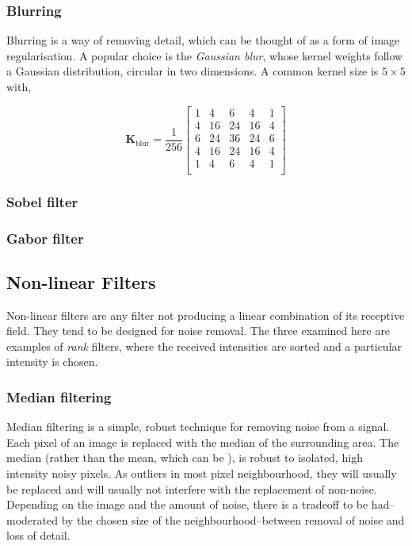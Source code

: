 \documentclass[11pt]{amsart}
\begin{document}
\subsubsection{Blurring}

Blurring is a way of removing detail, which can be thought of as a form of image regularisation. A popular choice is the \emph{Gaussian blur}, whose kernel weights follow a Gaussian distribution, circular in two dimensions. A common kernel size is $5 \times 5$ with,

$$
\mathbf{K}_{\text{blur}} = \frac{1}{256}
\begin{bmatrix}
1 & 4 & 6 & 4 & 1 \\
4 & 16 & 24 & 16 & 4 \\
6 & 24 & 36 & 24 & 6 \\
4 & 16 & 24 & 16 & 4 \\
1 & 4 & 6 & 4 & 1 \\
\end{bmatrix}
$$

\subsubsection{Sobel filter}

\subsubsection{Gabor filter}


\subsection{Non-linear Filters}

Non-linear filters are any filter not producing a linear combination of its receptive field. They tend to be designed for noise removal. The three examined here are examples of \emph{rank} filters, where the received intensities are sorted and a particular intensity is chosen.

\subsubsection{Median filtering}

Median filtering is a simple, robust technique for removing noise from a signal. Each pixel of an image is replaced with the median of the surrounding area. The median (rather than the mean, which can be ), is robust to isolated, high intensity noisy pixels. As outliers in most pixel neighbourhood, they will usually be replaced and will usually not interfere with the replacement of non-noise. Depending on the image and the amount of noise, there is a tradeoff to be had--moderated by the chosen size of the neighbourhood--between removal of noise and loss of detail.
\end{document}
